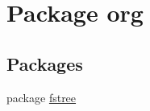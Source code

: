 \hypertarget{namespaceorg}{
\section{Package org}
\label{namespaceorg}
}
\subsection*{Packages}
\begin{DoxyCompactItemize}
\item 
package \hyperlink{namespaceorg_1_1fstree}{fstree}
\end{DoxyCompactItemize}
